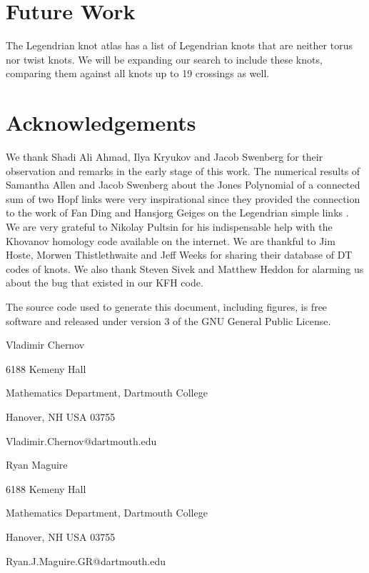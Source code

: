 \documentclass{article}
\theoremstyle{plain}
\begin{document}
    \section{Future Work}
        The Legendrian knot atlas \cite{LegendrianKnotAtlas} has a list of
        Legendrian knots that are neither torus nor twist knots. We will be
        expanding our search to include these knots, comparing them against
        all knots up to 19 crossings as well.
    \section{Acknowledgements}
        We thank Shadi Ali Ahmad, Ilya Kryukov and Jacob Swenberg for their
        observation and remarks in the early stage of this work. The numerical
        results of Samantha Allen and Jacob Swenberg about the Jones Polynomial
        of a connected sum of two Hopf links were very inspirational since they
        provided the connection to the work of Fan Ding and Hansjorg Geiges on
        the Legendrian simple links . We are very grateful to Nikolay Pultsin
        for his indispensable help with the Khovanov homology code available
        on the internet. We are thankful to Jim Hoste, Morwen Thistlethwaite
        and Jeff Weeks for sharing their database of DT codes of knots.
        We also thank Steven Sivek and Matthew Heddon
        for alarming us about the bug that
        existed in our KFH code.
    \newpage
    
    
    \newpage
    The source code used to generate this document, including figures,
    is free software and released under version 3 of the GNU General Public
    License.
    \par\hfill\par
    Vladimir Chernov
    \par
    6188 Kemeny Hall
    \par
    Mathematics Department, Dartmouth College
    \par
    Hanover, NH USA 03755
    \par
    Vladimir.Chernov@dartmouth.edu
    \par\hfill\par
    Ryan Maguire
    \par
    6188 Kemeny Hall
    \par
    Mathematics Department, Dartmouth College
    \par
    Hanover, NH USA 03755
    \par
    Ryan.J.Maguire.GR@dartmouth.edu
\end{document}
